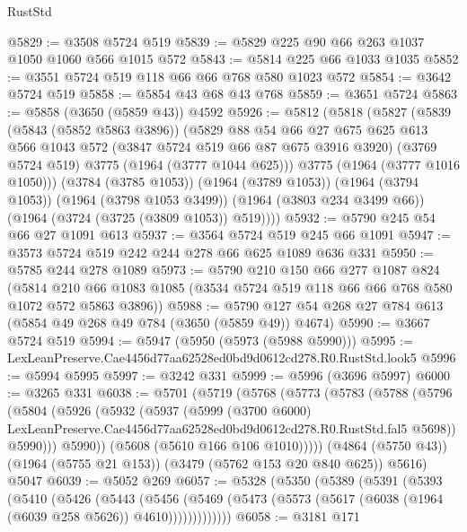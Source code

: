\begin{lexlean}{RustStd}
\begin{coremodule}
@5829 := @3508 @5724 @519
@5839 := @5829 @225 @90 @66 @263 @1037 @1050 @1060 @566 @1015 @572
@5843 := @5814 @225 @66 @1033 @1035
@5852 := @3551 @5724 @519 @118 @66 @66 @768 @580 @1023 @572
@5854 := @3642 @5724 @519
@5858 := @5854 @43 @68 @43 @768
@5859 := @3651 @5724
@5863 := @5858 (@3650 (@5859 @43)) @4592
@5926 := @5812
    (@5818
      (@5827
        (@5839
          (@5843 (@5852 @5863 @3896))
          (@5829
            @88
            @54
            @66
            @27
            @675
            @625
            @613
            @566
            @1043
            @572
            (@3847 @5724 @519 @66 @87 @675 @3916 @3920)
            (@3769 @5724 @519)
            @3775
            (@1964 (@3777 @1044 @625)))
          @3775
          (@1964 (@3777 @1016 @1050)))
        (@3784 (@3785 @1053))
        (@1964 (@3789 @1053))
        (@1964 (@3794 @1053))
        (@1964 (@3798 @1053 @3499))
        (@1964 (@3803 @234 @3499 @66))
        (@1964 (@3724 (@3725 (@3809 @1053)) @519))))
@5932 := @5790 @245 @54 @66 @27 @1091 @613
@5937 := @3564 @5724 @519 @245 @66 @1091
@5947 := @3573 @5724 @519 @242 @244 @278 @66 @625 @1089 @636 @331
@5950 := @5785 @244 @278 @1089
@5973 := @5790
    @210
    @150
    @66
    @277
    @1087
    @824
    (@5814 @210 @66 @1083 @1085 (@3534 @5724 @519 @118 @66 @66 @768 @580 @1072 @572 @5863 @3896))
@5988 := @5790 @127 @54 @268 @27 @784 @613 (@5854 @49 @268 @49 @784 (@3650 (@5859 @49)) @4674)
@5990 := @3667 @5724 @519
@5994 := @5947 (@5950 (@5973 (@5988 @5990)))
@5995 := LexLeanPreserve.Cae4456d77aa62528ed0bd9d0612cd278.R0.RustStd.look5
@5996 := @5994 @5995
@5997 := @3242 @331
@5999 := @5996 (@3696 @5997)
@6000 := @3265 @331
@6038 := @5701
    (@5719
      (@5768
        (@5773
          (@5783
            (@5788
              (@5796
                (@5804
                  (@5926
                    (@5932
                      (@5937
                        (@5999
                          (@3700 @6000)
                          LexLeanPreserve.Cae4456d77aa62528ed0bd9d0612cd278.R0.RustStd.fal5
                          @5698))
                      @5990)))
                @5990))
            (@5608 (@5610 @166 @106 @1010)))))
      (@4864 (@5750 @43))
      (@1964 (@5755 @21 @153))
      (@3479 (@5762 @153 @20 @840 @625))
      @5616)
    @5047
@6039 := @5052 @269
@6057 := @5328
    (@5350
      (@5389
        (@5391
          (@5393
            (@5410
              (@5426
                (@5443
                  (@5456
                    (@5469 (@5473 (@5573 (@5617 (@6038 (@1964 (@6039 @258 @5626)) @4610)))))))))))))
@6058 := @3181 @171

\end{coremodule}
\end{lexlean}
